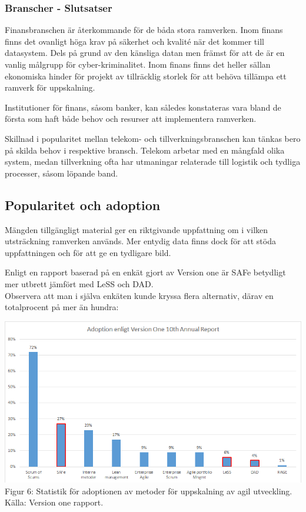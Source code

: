 		\subsubsection{Branscher - Slutsatser}
		
			Finansbranschen är återkommande för de båda stora ramverken. Inom finans finns det ovanligt höga krav på säkerhet och kvalité när det kommer till datasystem. Dels på grund av den känsliga datan men främst för att de är en vanlig målgrupp för cyber-kriminalitet. Inom finans finns det heller sällan ekonomiska hinder för projekt av tillräcklig storlek för att behöva tillämpa ett ramverk för uppskalning. 
			
			Institutioner för finans, såsom banker, kan således konstateras vara bland de första som haft både behov och resurser att implementera ramverken.
			
			
			Skillnad i popularitet mellan telekom- och tillverkningsbranschen kan tänkas bero på skilda behov i respektive bransch. Telekom arbetar med en mångfald olika system, medan tillverkning ofta har utmaningar relaterade till logistik och tydliga processer, såsom löpande band.
			
	

	\subsection{Popularitet och adoption}
	
		Mängden tillgängligt material ger en riktgivande uppfattning om i vilken utsträckning ramverken används. Mer entydig data finns dock för att stöda uppfattningen och för att ge en tydligare bild.
		
		Enligt en rapport baserad på en enkät gjort av Version one är SAFe betydligt mer utbrett jämfört med LeSS och DAD. \cite{version_one_report} \\	
		
		Observera att man i själva enkäten kunde kryssa flera alternativ, därav en totalprocent på mer än hundra:
		
		\begin{center}
			\includegraphics{Grafer/AnnualReport_Adoption.png}
			\\Figur 6: Statistik för adoptionen av metoder för uppskalning av agil utveckling. Källa: Version one rapport. \cite{version_one_report}
		\end{center}
		
